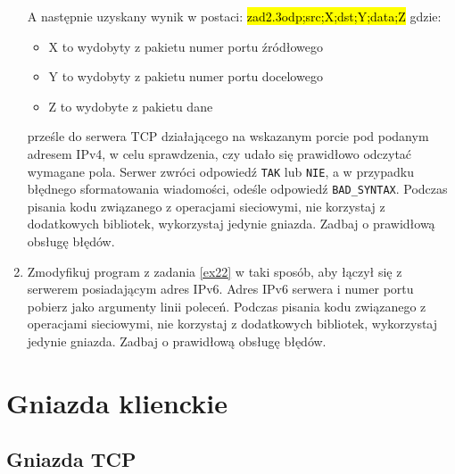 \documentclass{article}
\newcommand{\hlc}[2][shadecolor]{ 	{\sethlcolor{#1} \hl{#2}} }
\begin{document}
\begin{enumerate}[label=\textbf{2.\arabic*}]
\noindent A następnie uzyskany wynik w postaci: \hlc[shadecolor]{ zad2.3odp;src;X;dst;Y;data;Z } gdzie:

\begin{itemize}
\item X to wydobyty z pakietu numer portu źródłowego
\item Y to wydobyty z pakietu numer portu docelowego
\item Z to wydobyte z pakietu dane 
\end{itemize}

 prześle do serwera TCP działającego na wskazanym porcie pod podanym adresem IPv4, w celu sprawdzenia, czy udało się prawidłowo odczytać wymagane pola. Serwer zwróci odpowiedź \texttt{TAK} lub \texttt{NIE}, a w przypadku błędnego sformatowania wiadomości, odeśle odpowiedź \texttt{BAD\_SYNTAX}.  Podczas pisania kodu związanego z operacjami sieciowymi, nie korzystaj z dodatkowych bibliotek, wykorzystaj jedynie gniazda. Zadbaj o prawidłową obsługę błędów. 
 

  \item Zmodyfikuj program z zadania \ref{ex22} w taki sposób,  aby łączył się z serwerem posiadającym adres IPv6.  Adres IPv6 serwera i numer portu pobierz jako argumenty linii poleceń. Podczas pisania kodu związanego z operacjami sieciowymi, nie korzystaj z dodatkowych bibliotek, wykorzystaj jedynie gniazda. Zadbaj o prawidłową obsługę błędów. 

\end{enumerate}

\newpage
\section{Gniazda klienckie}

\subsection*{Gniazda TCP}
\end{document}
